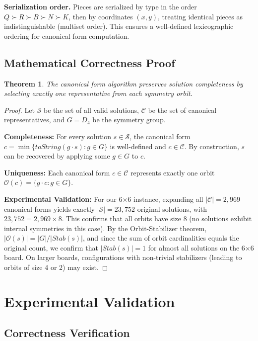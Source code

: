 \documentclass[12pt,a4paper]{article}
\newtheorem{theorem}{Theorem}[section]
\theoremstyle{definition}
\begin{document}
\textbf{Serialization order.} Pieces are serialized by type in the order $Q \succ R \succ B \succ N \succ K$, then by coordinates $(x,y)$, treating identical pieces as indistinguishable (multiset order). This ensures a well-defined lexicographic ordering for canonical form computation.

\subsection{Mathematical Correctness Proof}

\begin{theorem}
The canonical form algorithm preserves solution completeness by selecting exactly one representative from each symmetry orbit.
\end{theorem}

\begin{proof}
Let $\mathcal{S}$ be the set of all valid solutions, $\mathcal{C}$ be the set of canonical representatives, and $G = D_4$ be the symmetry group.

\textbf{Completeness:} For every solution $s \in \mathcal{S}$, the canonical form $c = \min\{toString(g \cdot s) : g \in G\}$ is well-defined and $c \in \mathcal{C}$. By construction, $s$ can be recovered by applying some $g \in G$ to $c$.

\textbf{Uniqueness:} Each canonical form $c \in \mathcal{C}$ represents exactly one orbit $\mathcal{O}(c) = \{g \cdot c : g \in G\}$.

\textbf{Experimental Validation:} For our 6$\times$6 instance, expanding all $|\mathcal{C}| = 2,969$ canonical forms yields exactly $|\mathcal{S}| = 23,752$ original solutions, with $23,752 = 2,969 \times 8$. This confirms that all orbits have size 8 (no solutions exhibit internal symmetries in this case). By the Orbit-Stabilizer theorem, $|\mathcal{O}(s)| = |G|/|Stab(s)|$, and since the sum of orbit cardinalities equals the original count, we confirm that $|Stab(s)| = 1$ for almost all solutions on the 6$\times$6 board. On larger boards, configurations with non-trivial stabilizers (leading to orbits of size 4 or 2) may exist.
\end{proof}

\section{Experimental Validation}

\subsection{Correctness Verification}
\end{document}
